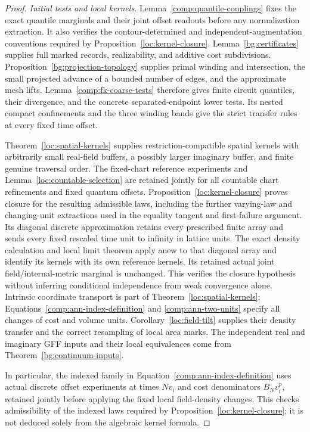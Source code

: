 \begin{proof}
\emph{Initial tests and local kernels.}
Lemma~\ref{comp:quantile-couplings} fixes the exact quantile marginals
and their joint offset readouts before any normalization extraction.
It also verifies the contour-determined and independent-augmentation
conventions required by Proposition~\ref{loc:kernel-closure}.
Lemma~\ref{bg:certificates} supplies full marked records, realizability,
and additive cost subdivisions.  Proposition~\ref{bg:projection-topology}
supplies primal winding and intersection, the small projected advance
of a bounded number of edges, and the approximate mesh lifts.
Lemma~\ref{comp:fk-coarse-tests} therefore gives finite circuit
quantiles, their divergence, and the concrete separated-endpoint
lower tests.  Its nested compact confinements and the three winding
bands give the strict transfer rules at every fixed time offset.

Theorem~\ref{loc:spatial-kernels} supplies restriction-compatible
spatial kernels with arbitrarily small real-field buffers, a possibly
larger imaginary buffer, and finite genuine traversal order.
The fixed-chart reference experiments and
Lemma~\ref{loc:countable-selection} are retained jointly for all
countable chart refinements and fixed quantum offsets.
Proposition~\ref{loc:kernel-closure} proves closure for the resulting
admissible laws, including the further varying-law and changing-unit
extractions used in the equality tangent and first-failure argument.
Its diagonal discrete approximation retains every prescribed finite
array and sends every fixed rescaled time unit to infinity in lattice
units.  The exact density calculation and local limit theorem apply
anew to that diagonal array and identify its kernels with its own
reference kernels.  Its retained actual joint field/internal-metric
marginal is unchanged.  This verifies the closure hypothesis without
inferring conditional independence from weak convergence alone.
Intrinsic coordinate
transport is part of Theorem~\ref{loc:spatial-kernels};
Equations~\eqref{comp:ann-index-definition} and
\eqref{comp:ann-two-units} specify all changes of cost and volume
units.  Corollary~\ref{loc:field-tilt} supplies their density transfer
and the correct resampling of local area marks.  The independent
real and imaginary GFF inputs and their local equivalences come from
Theorem~\ref{bg:continuum-inputs}.

In particular, the indexed family in
Equation~\eqref{comp:ann-index-definition} uses actual discrete
offset experiments at times $Nv_i$ and cost denominators
$B_Nv_i^p$, retained jointly before applying the fixed local
field-density changes.  This checks admissibility of the indexed
laws required by Proposition~\ref{loc:kernel-closure}; it is not
deduced solely from the algebraic kernel formula.


\end{proof}
